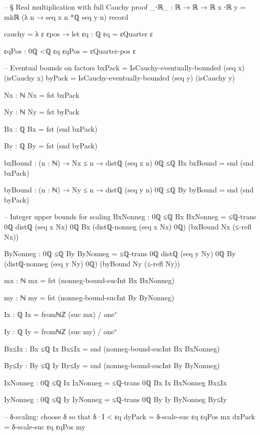\documentclass[11pt,a4paper]{book}
\begin{document}
\begin{code}
-- § Real multiplication with full Cauchy proof
_⋅ℝ_ : ℝ → ℝ → ℝ
x ⋅ℝ y = mkℝ (λ n → seq x n *ℚ seq y n) record
  { cauchy = λ ε εpos →
      let
        εq : ℚ
        εq = εQuarter ε

        εqPos : 0ℚ <ℚ εq
        εqPos = εQuarter-pos ε

        -- Eventual bounds on factors
        bxPack = IsCauchy-eventually-bounded (seq x) (isCauchy x)
        byPack = IsCauchy-eventually-bounded (seq y) (isCauchy y)

        Nx : ℕ
        Nx = fst bxPack

        Ny : ℕ
        Ny = fst byPack

        Bx : ℚ
        Bx = fst (snd bxPack)

        By : ℚ
        By = fst (snd byPack)

        bxBound : (n : ℕ) → Nx ≤ n → distℚ (seq x n) 0ℚ ≤ℚ Bx
        bxBound = snd (snd bxPack)

        byBound : (n : ℕ) → Ny ≤ n → distℚ (seq y n) 0ℚ ≤ℚ By
        byBound = snd (snd byPack)

        -- Integer upper bounds for scaling
        BxNonneg : 0ℚ ≤ℚ Bx
        BxNonneg =
          ≤ℚ-trans {0ℚ} {distℚ (seq x Nx) 0ℚ} {Bx}
            (distℚ-nonneg (seq x Nx) 0ℚ)
            (bxBound Nx (≤-refl Nx))

        ByNonneg : 0ℚ ≤ℚ By
        ByNonneg =
          ≤ℚ-trans {0ℚ} {distℚ (seq y Ny) 0ℚ} {By}
            (distℚ-nonneg (seq y Ny) 0ℚ)
            (byBound Ny (≤-refl Ny))

        mx : ℕ
        mx = fst (nonneg-bound-sucInt Bx BxNonneg)

        my : ℕ
        my = fst (nonneg-bound-sucInt By ByNonneg)

        Ix : ℚ
        Ix = fromℕℤ (suc mx) / one⁺

        Iy : ℚ
        Iy = fromℕℤ (suc my) / one⁺

        Bx≤Ix : Bx ≤ℚ Ix
        Bx≤Ix = snd (nonneg-bound-sucInt Bx BxNonneg)

        By≤Iy : By ≤ℚ Iy
        By≤Iy = snd (nonneg-bound-sucInt By ByNonneg)

        IxNonneg : 0ℚ ≤ℚ Ix
        IxNonneg = ≤ℚ-trans {0ℚ} {Bx} {Ix} BxNonneg Bx≤Ix

        IyNonneg : 0ℚ ≤ℚ Iy
        IyNonneg = ≤ℚ-trans {0ℚ} {By} {Iy} ByNonneg By≤Iy

        -- δ-scaling: choose δ so that δ·I < εq
        dyPack = δ-scale-suc εq εqPos mx
        dxPack = δ-scale-suc εq εqPos my

}
\end{code}
\end{document}
